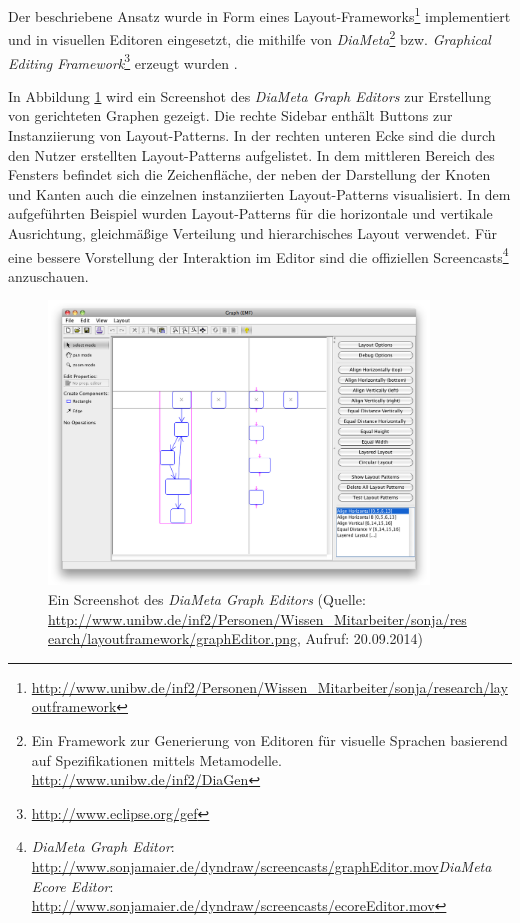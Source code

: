 Der beschriebene Ansatz wurde in Form eines Layout-Frameworks\footnote{\url{http://www.unibw.de/inf2/Personen/Wissen_Mitarbeiter/sonja/research/layoutframework}} implementiert und in visuellen Editoren eingesetzt, die mithilfe von \textit{DiaMeta}\footnote{Ein Framework zur Generierung von Editoren für visuelle Sprachen basierend auf Spezifikationen mittels Metamodelle. \url{http://www.unibw.de/inf2/DiaGen}} bzw. \textit{Graphical Editing Framework}\footnote{\url{http://www.eclipse.org/gef}} erzeugt wurden \cite{Maier12A-Pattern-based}.

In Abbildung \ref{fig:diameta-graph-editor-screenshot} wird ein Screenshot des \textit{DiaMeta Graph Editors} zur Erstellung von gerichteten Graphen gezeigt. Die rechte Sidebar enthält Buttons zur Instanziierung von Layout-Patterns. In der rechten unteren Ecke sind die durch den Nutzer erstellten Layout-Patterns aufgelistet. In dem mittleren Bereich des Fensters befindet sich die Zeichenfläche, der neben der Darstellung der Knoten und Kanten auch die einzelnen instanziierten Layout-Patterns visualisiert. In dem aufgeführten Beispiel wurden Layout-Patterns für die horizontale und vertikale Ausrichtung, gleichmäßige Verteilung und hierarchisches Layout verwendet. Für eine bessere Vorstellung der Interaktion im Editor sind die offiziellen Screencasts\footnote{\textit{DiaMeta Graph Editor}: \url{http://www.sonjamaier.de/dyndraw/screencasts/graphEditor.mov}\newline\textit{DiaMeta Ecore Editor}: \url{http://www.sonjamaier.de/dyndraw/screencasts/ecoreEditor.mov}} anzuschauen.

\begin{figure}[hbt]
    \centering
    \includegraphics[width=0.9\textwidth]{assets/diameta-graph-editor-screenshot}
    \newcommand{\captionvalue}{Ein Screenshot des \textit{DiaMeta Graph Editors}}
    \caption[\captionvalue]{\captionvalue{ }(Quelle: \url{http://www.unibw.de/inf2/Personen/Wissen_Mitarbeiter/sonja/research/layoutframework/graphEditor.png}, Aufruf: 20.09.2014)}
    \label{fig:diameta-graph-editor-screenshot}
\end{figure}

